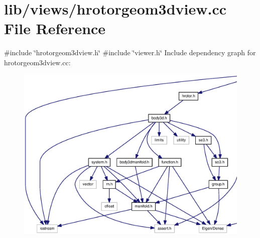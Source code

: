 \section{lib/views/hrotorgeom3dview.cc \-File \-Reference}
\label{hrotorgeom3dview_8cc}
{\ttfamily \#include \char`\"{}hrotorgeom3dview.\-h\char`\"{}}\*
{\ttfamily \#include \char`\"{}viewer.\-h\char`\"{}}\*
\-Include dependency graph for hrotorgeom3dview.\-cc\-:
\nopagebreak
\begin{figure}[H]
\begin{center}
\leavevmode
\includegraphics[width=350pt]{hrotorgeom3dview_8cc__incl}
\end{center}
\end{figure}

